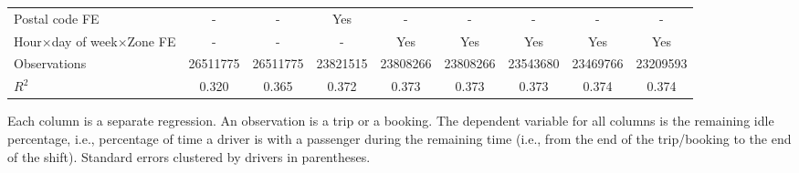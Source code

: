 \documentclass[reviewmode,AEJ]{AEA}
\begin{document}
\begin{appendices}
\begin{table}[h]
{\begin{tabular}{l*{8}{S}}
				\addlinespace
				Postal code FE      &         {-}         &         {-}         &       {Yes}         &         {-}         &         {-}         &         {-}         &         {-}         &         {-}         \\
				\addlinespace
				Hour\(\times\)day of week\(\times\)Zone FE&         {-}         &         {-}         &         {-}         &       {Yes}         &       {Yes}         &       {Yes}         &       {Yes}         &       {Yes}         \\
				\addlinespace
				Observations        &\num{26511775}         &\num{26511775}         &\num{23821515}         &\num{23808266}         &\num{23808266}         &\num{23543680}         &\num{23469766}         &\num{23209593}         \\
				$R^2$             &     {0.320}         &     {0.365}         &     {0.372}         &     {0.373}         &     {0.373}         &     {0.373}         &     {0.374}         &     {0.374}         \\
				\bottomrule
				\end{tabular}
				}
 			\begin{tablenotes}
 				Each column is a separate regression. An observation is a trip or a booking. The dependent variable for all columns is the remaining idle percentage, i.e., percentage of time a driver is with a passenger during the remaining time (i.e., from the end of the trip/booking to the end of the shift). Standard errors clustered by drivers in parentheses. 
 			\end{tablenotes}
 	\end{table}
\end{appendices}
\end{document}
